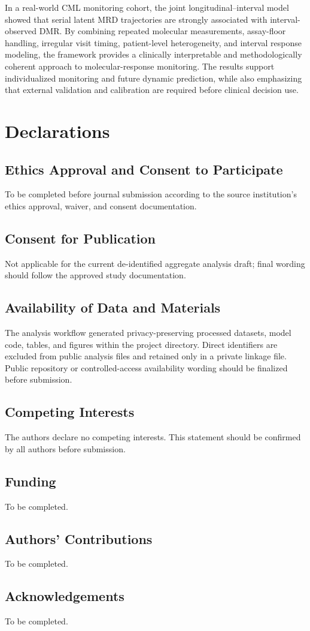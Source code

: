 \documentclass[11pt]{article}
\begin{document}
In a real-world CML monitoring cohort, the joint longitudinal--interval model showed that serial latent MRD trajectories are strongly associated with interval-observed DMR. By combining repeated molecular measurements, assay-floor handling, irregular visit timing, patient-level heterogeneity, and interval response modeling, the framework provides a clinically interpretable and methodologically coherent approach to molecular-response monitoring. The results support individualized monitoring and future dynamic prediction, while also emphasizing that external validation and calibration are required before clinical decision use.

\section*{Declarations}

\subsection*{Ethics Approval and Consent to Participate}
To be completed before journal submission according to the source institution's ethics approval, waiver, and consent documentation.

\subsection*{Consent for Publication}
Not applicable for the current de-identified aggregate analysis draft; final wording should follow the approved study documentation.

\subsection*{Availability of Data and Materials}
The analysis workflow generated privacy-preserving processed datasets, model code, tables, and figures within the project directory. Direct identifiers are excluded from public analysis files and retained only in a private linkage file. Public repository or controlled-access availability wording should be finalized before submission.

\subsection*{Competing Interests}
The authors declare no competing interests. This statement should be confirmed by all authors before submission.

\subsection*{Funding}
To be completed.

\subsection*{Authors' Contributions}
To be completed.

\subsection*{Acknowledgements}
To be completed.



\end{document}
